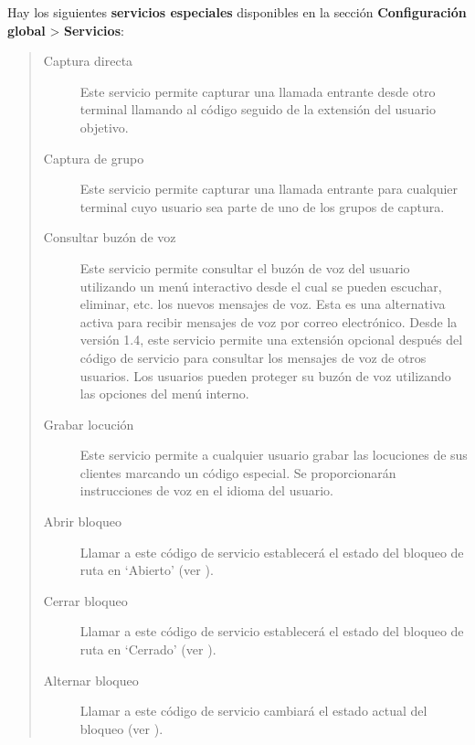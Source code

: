 \documentclass[letterpaper,10pt,spanish]{sphinxmanual}
\begin{document}
Hay los siguientes \textbf{servicios especiales} disponibles en la sección \textbf{Configuración global} \textgreater{} \textbf{Servicios}:
\begin{quote}
\begin{description}
\item[{Captura directa}] \leavevmode
Este servicio permite capturar una llamada entrante desde otro terminal llamando al código seguido de la extensión del usuario objetivo.

\item[{Captura de grupo}] \leavevmode
Este servicio permite capturar una llamada entrante para cualquier terminal cuyo usuario sea parte de uno de los grupos de captura.

\item[{Consultar buzón de voz}] \leavevmode
Este servicio permite consultar el buzón de voz del usuario utilizando un menú interactivo desde el cual se pueden escuchar, eliminar, etc. los nuevos mensajes de voz. Esta es una alternativa activa para recibir mensajes de voz por correo electrónico. Desde la versión 1.4, este servicio permite una extensión opcional después del código de servicio para consultar los mensajes de voz de otros usuarios. Los usuarios pueden proteger su buzón de voz utilizando las opciones del menú interno.

\item[{Grabar locución}] \leavevmode
Este servicio permite a cualquier usuario grabar las locuciones de sus clientes marcando un código especial. Se proporcionarán instrucciones de voz en el idioma del usuario.

\item[{Abrir bloqueo}] \leavevmode
Llamar a este código de servicio establecerá el estado del bloqueo de ruta en `Abierto' (ver {\hyperref[administration_portal/client/vpbx/routing_tools/route_locks:route\string-locks]{}}).

\item[{Cerrar bloqueo}] \leavevmode
Llamar a este código de servicio establecerá el estado del bloqueo de ruta en `Cerrado' (ver {\hyperref[administration_portal/client/vpbx/routing_tools/route_locks:route\string-locks]{}}).

\item[{Alternar bloqueo}] \leavevmode
Llamar a este código de servicio cambiará el estado actual del bloqueo (ver {\hyperref[administration_portal/client/vpbx/routing_tools/route_locks:route\string-locks]{}}).


\end{description}
\end{quote}
\end{document}
